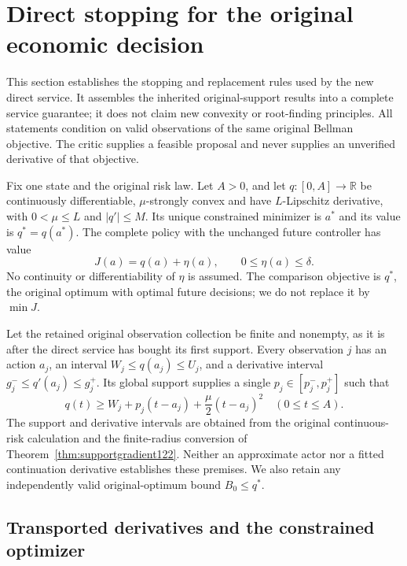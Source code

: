 \section{Direct stopping for the original economic decision}
\label{supp:decisionstopping126}

This section establishes the stopping and replacement rules used by the
new direct service.  It assembles the inherited original-support results
into a complete service guarantee; it does not claim new convexity or
root-finding principles.  All statements condition on valid observations
of the same original Bellman objective.  The critic supplies a feasible
proposal and never supplies an unverified derivative of that objective.

Fix one state and the original risk law.  Let $A>0$, and let
$q:[0,A]\to\mathbb R$ be continuously differentiable, $\mu$-strongly
convex and have $L$-Lipschitz derivative, with $0<\mu\le L$ and
$|q'|\le M$.  Its unique constrained minimizer is $a^*$ and its value is
$q^*=q(a^*)$.  The complete policy with the unchanged future controller
has value
\begin{equation}\label{eq:directfuture126}
 J(a)=q(a)+\eta(a),\qquad 0\le\eta(a)\le\delta.
\end{equation}
No continuity or differentiability of $\eta$ is assumed.  The comparison
objective is $q^*$, the original optimum with optimal future decisions;
we do not replace it by $\min J$.

Let the retained original observation collection be finite and nonempty,
as it is after the direct service has bought its first support.  Every
observation $j$ has an action $a_j$, an interval
$W_j\le q(a_j)\le U_j$, and a derivative interval
$g_j^-\le q'(a_j)\le g_j^+$.  Its global support supplies a single
$p_j\in[p_j^-,p_j^+]$ such that
\[
 q(t)\ge W_j+p_j(t-a_j)+\frac\mu2(t-a_j)^2
 \quad(0\le t\le A).
\]
The support and derivative intervals are obtained from the original
continuous-risk calculation and the finite-radius conversion of
Theorem~\ref{thm:supportgradient122}.  Neither an approximate actor nor
a fitted continuation derivative establishes these premises.  We also
retain any independently valid original-optimum bound $B_0\le q^*$.

\subsection{Transported derivatives and the constrained optimizer}

